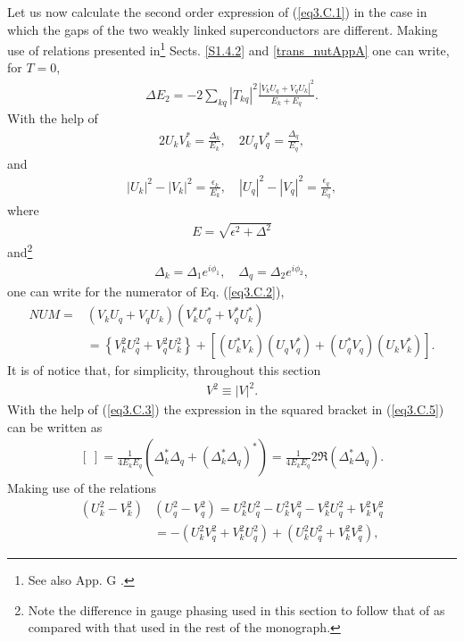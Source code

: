 Let us now calculate the second order expression of  (\ref{eq3.C.1}) in the case in which the gaps of the two weakly linked superconductors are different.
Making use of  relations presented in\footnote{See also App. G \cite{Brink:05}.} Sects. \ref{S1.4.2} and \ref{trans_nutAppA} one can write, for $T=0$,
\begin{align}\label{eq3.C.2}
\Delta E_2=-2\sum_{kq}|T_{kq}|^2\frac{|V_kU_q+V_qU_k|^2}{E_k+E_q}.
\end{align}
With the help of 
\begin{align}\label{eq3.C.3}
2U_kV_k^*=\frac{\Delta_k}{E_k},\quad 2U_qV_q^*=\frac{\Delta_q}{E_q},
\end{align}
and
\begin{align}
|U_k|^2-|V_k|^2=\frac{\epsilon_k}{E_k},\quad |U_q|^2-|V_q|^2=\frac{\epsilon_q}{E_q},
\end{align}
where
\begin{align}
E=\sqrt{\epsilon^2+\Delta^2}
\end{align}
and\footnote{Note the difference in gauge phasing used in this section to follow that of \cite{Anderson:64b} as compared with that used in the rest of the monograph.}
\begin{align}\label{eq3.C.6}
\Delta_k=\Delta_1e^{i\phi_1},\quad \Delta_q=\Delta_2e^{i\phi_2},
\end{align}
one can write for the numerator of Eq. (\ref{eq3.C.2}),
\begin{align}\label{eq3.C.5}
\nonumber NUM=&\left(V_kU_q+V_qU_k\right)\left(V^*_kU^*_q+V^*_qU^*_k\right)\\
&=\left\{V^2_kU^2_q+V^2_qU^2_k\right\}+\left[(U_k^*V_k)(U_qV^*_q)+(U_q^*V_q)(U_kV^*_k)\right].
\end{align}
It is of notice that, for simplicity, throughout this section
\begin{align}
V^2\equiv|V|^2.
\end{align}
With the help of (\ref{eq3.C.3}) the expression in the squared bracket in (\ref{eq3.C.5}) can be written as 
\begin{align}\label{eq3.C.9}
[\;]=\frac{1}{4E_kE_q}\left(\Delta_k^*\Delta_q+(\Delta_k^*\Delta_q)^*\right)=\frac{1}{4E_kE_q}2\Re(\Delta_k^*\Delta_q).
\end{align}
Making use of the relations
\begin{align}
\nonumber \left(U_k^2-V_k^2\right)&\left(U_q^2-V_q^2\right)=U_k^2U_q^2-U_k^2V_q^2-V_k^2U_q^2+V_k^2V_q^2\\
&=-\left(U_k^2V_q^2+V_k^2U_q^2\right)+\left(U_k^2U_q^2+V_k^2V_q^2\right),
\end{align}
